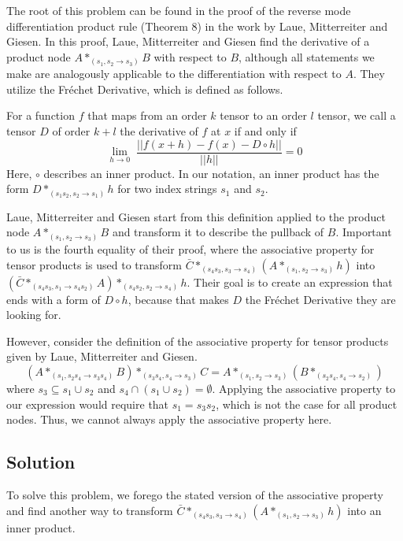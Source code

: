 \documentclass[12pt, a4paper]{report}
\begin{document}
The root of this problem can be found in the proof of the reverse mode differentiation product rule (Theorem 8) in the work \cite{tensorpaper} by Laue, Mitterreiter and Giesen.
In this proof, Laue, Mitterreiter and Giesen find the derivative of a product node $A *_{(s_1, s_2 \rightarrow s_3)} B$ with respect to $B$, although all statements we make are analogously applicable to the differentiation with respect to $A$.
They utilize the Fr\'{e}chet Derivative, which is defined as follows.

For a function $f$ that maps from an order $k$ tensor to an order $l$ tensor, we call a tensor $D$ of order $k+l$ the derivative of $f$ at $x$ if and only if
$$
\lim_{h \rightarrow 0} \; \frac{||f(x+h) - f(x) - D \circ h||}{||h||} = 0
$$
Here, $\circ$ describes an inner product.
In our notation, an inner product has the form $D *_{(s_1 s_2, s_2 \rightarrow s_1)} h$ for two index strings $s_1$ and $s_2$.

Laue, Mitterreiter and Giesen start from this definition applied to the product node $A *_{(s_1, s_2 \rightarrow s_3)} B$ and transform it to describe the pullback of $B$.
Important to us is the fourth equality of their proof, where the associative property for tensor products is used to transform $\bar{C} *_{(s_4s_3,s_3 \rightarrow s_4)} (A *_{(s_1,s_2 \rightarrow s_3)} h)$ into $(\bar{C} *_{(s_4s_3,s_1 \rightarrow s_4s_2)} A) *_{(s_4s_2,s_2 \rightarrow s_4)} h$.
Their goal is to create an expression that ends with a form of $D \circ h$, because that makes $D$ the Fr\'{e}chet Derivative they are looking for.

However, consider the definition of the associative property for tensor products given by Laue, Mitterreiter and Giesen.
$$
(A *_{(s_1, s_2 s_4 \rightarrow s_3 s_4)} B) *_{(s_3 s_4, s_4 \rightarrow s_3)} C = A *_{(s_1, s_2 \rightarrow s_3)} (B *_{(s_2 s_4, s_4 \rightarrow s_2)})
$$
where $s_3 \subseteq s_1 \cup s_2$ and $s_4 \cap (s_1 \cup s_2) = \emptyset$. 
Applying the associative property to our expression would require that $s_1 = s_3 s_2$, which is not the case for all product nodes.
Thus, we cannot always apply the associative property here.

\subsection{Solution}
To solve this problem, we forego the stated version of the associative property and find another way to transform $\bar{C} *_{(s_4s_3,s_3 \rightarrow s_4)} (A *_{(s_1,s_2 \rightarrow s_3)} h)$ into an inner product.
\end{document}
